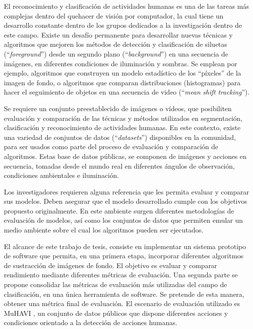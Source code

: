 \indent El reconocimiento y clasificación de actividades humanas es una de las tareas más complejas dentro del quehacer de visión por computador, la cual tiene un desarrollo constante dentro de los grupos dedicados a la investigación dentro de este campo. Existe un desafío permanente para desarrollar nuevas técnicas y algoritmos que mejoren los métodos de detección y clasificación de siluetas (``\textit{foreground}'') desde un segundo plano (``\textit{background}'') en una secuencia de imágenes, en diferentes condiciones de iluminación y sombras. Se emplean por ejemplo, algoritmos que construyen un modelo estadístico de los ``píxeles'' de la imagen de fondo, o algoritmos que comparan distribuciones (histogramas) para hacer el seguimiento de objetos en una secuencia de video (``\textit{mean shift tracking}''). 

\indent Se requiere un conjunto preestablecido de imágenes o vídeos, que posibiliten evaluación y comparación de las técnicas y métodos utilizados en segmentación, clasificación y reconocimiento de actividades humanas. En este contexto, existe una variedad de conjuntos de datos (``\textit{datasets}'') disponibles en la comunidad, para ser usados como parte del proceso de evaluación y comparación de algoritmos. Estas base de datos públicas, se componen de imágenes y acciones en secuencia, tomadas desde el mundo real en diferentes ángulos de observación, condiciones ambientales e iluminación.

\indent Los investigadores requieren alguna referencia que les permita evaluar y comparar sus modelos. Deben asegurar que el modelo desarrollado cumple con los objetivos propuesto originalmente. En este ambiente surgen diferentes metodologías de evaluación de modelos, así como los conjuntos de datos que permiten emular un medio ambiente sobre el cual los algoritmos pueden ser ejecutados. 

\indent El alcance de este trabajo de tesis, consiste en implementar un sistema prototipo de software que permita, en una primera etapa, incorporar diferentes algoritmos de sustracción de imágenes de fondo. El objetivo es evaluar y comparar rendimiento mediante diferentes métricas de evaluación. Una segunda parte se propone consolidar las métricas de evaluación más utilizadas del campo de clasificación, en una única herramienta de software. Se pretende de esta manera, obtener una métrica final de evaluación. El escenario de evaluación utilizado es MuHAVI \cite{singh_muhavi_2010}, un conjunto de datos públicos que dispone diferentes acciones y condiciones orientado a la detección de acciones humanas.





